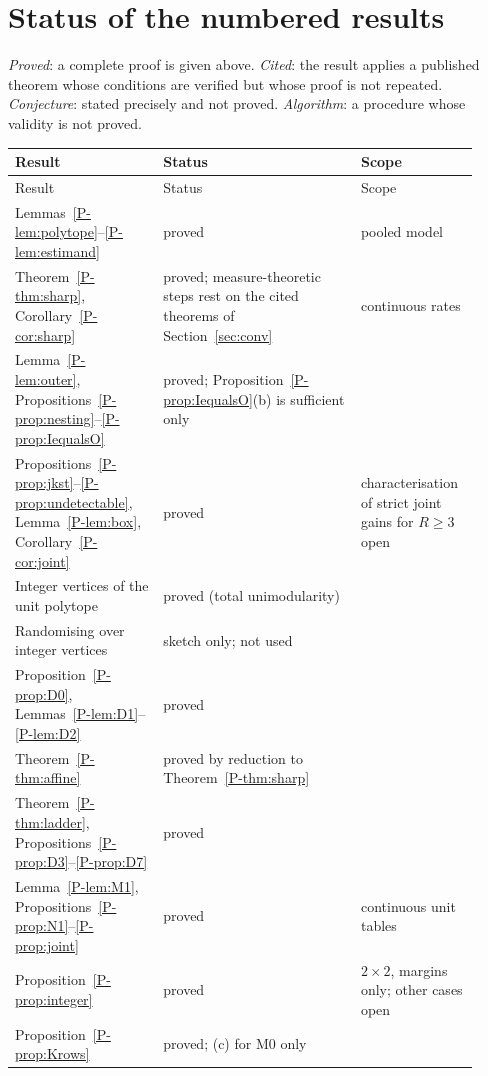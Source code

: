 \section{Status of the numbered results}\label{sec:statuslist}

\emph{Proved}: a complete proof is given above. \emph{Cited}: the result applies a
published theorem whose conditions are verified but whose proof is not repeated.
\emph{Conjecture}: stated precisely and not proved. \emph{Algorithm}: a procedure
whose validity is not proved.

{\small
\begin{longtable}{@{}L{0.30\linewidth}L{0.40\linewidth}L{0.22\linewidth}@{}}
\toprule
Result & Status & Scope \\
\midrule\endfirsthead
\toprule Result & Status & Scope \\ \midrule\endhead
Lemmas~\ref{P-lem:polytope}--\ref{P-lem:estimand} & proved & pooled model \\
Theorem~\ref{P-thm:sharp}, Corollary~\ref{P-cor:sharp} & proved; measure-theoretic steps rest on the cited theorems of Section~\ref{sec:conv} & continuous rates \\
Lemma~\ref{P-lem:outer}, Propositions~\ref{P-prop:nesting}--\ref{P-prop:IequalsO} & proved; Proposition~\ref{P-prop:IequalsO}(b) is sufficient only & \\
Propositions~\ref{P-prop:jkst}--\ref{P-prop:undetectable}, Lemma~\ref{P-lem:box}, Corollary~\ref{P-cor:joint} & proved & characterisation of strict joint gains for $R\ge3$ open \\
Integer vertices of the unit polytope & proved (total unimodularity) & \\
Randomising over integer vertices & sketch only; not used & \\
Proposition~\ref{P-prop:D0}, Lemmas~\ref{P-lem:D1}--\ref{P-lem:D2} & proved & \\
Theorem~\ref{P-thm:affine} & proved by reduction to Theorem~\ref{P-thm:sharp} & \\
Theorem~\ref{P-thm:ladder}, Propositions~\ref{P-prop:D3}--\ref{P-prop:D7} & proved & \\
Lemma~\ref{P-lem:M1}, Propositions~\ref{P-prop:N1}--\ref{P-prop:joint} & proved & continuous unit tables \\
Proposition~\ref{P-prop:integer} & proved & $2\times2$, margins only; other cases open \\
Proposition~\ref{P-prop:Krows} & proved; (c) for M0 only & \\

\end{longtable}}
